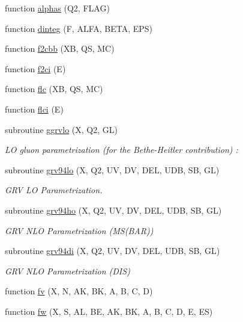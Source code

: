 \begin{DoxyCompactItemize}
function \hyperlink{djangoh__h_8f_af302ea72f46852040a91bbc6903668bb}{alphas} (Q2, F\+L\+AG)
\item 
function \hyperlink{djangoh__h_8f_a8f516ecea0c35714a195bc2245c008ec}{dinteg} (F, A\+L\+FA, B\+E\+TA, E\+PS)
\item 
function \hyperlink{djangoh__h_8f_ad21686603a997dca7276e97fdd737e95}{f2cbb} (XB, QS, MC)
\item 
function \hyperlink{djangoh__h_8f_a2ab06e9e548400420656b6514b985cb4}{f2ci} (E)
\item 
function \hyperlink{djangoh__h_8f_afc3079686b4b92832fe17ea940a7bd71}{flc} (XB, QS, MC)
\item 
function \hyperlink{djangoh__h_8f_a76aaa4502a6d8e0661a3e6921d3254e6}{flci} (E)
\item 
subroutine \hyperlink{djangoh__h_8f_a95790a4fe3b71ec2ca57ae683c2ff92e}{ggrvlo} (X, Q2, GL)
\begin{DoxyCompactList}\small\item\em LO gluon parametrization (for the Bethe-\/\+Heitler contribution) \+: \end{DoxyCompactList}\item 
subroutine \hyperlink{djangoh__h_8f_a5a7b1f97eb6b9635e61f608e336d2312}{grv94lo} (X, Q2, UV, DV, D\+EL, U\+DB, SB, GL)
\begin{DoxyCompactList}\small\item\em G\+RV LO Parametrization. \end{DoxyCompactList}\item 
subroutine \hyperlink{djangoh__h_8f_a5cf1c4c7f3996a1ee8f4332aac26168f}{grv94ho} (X, Q2, UV, DV, D\+EL, U\+DB, SB, GL)
\begin{DoxyCompactList}\small\item\em G\+RV N\+LO Parametrization (M\+S(\+B\+A\+R)) \end{DoxyCompactList}\item 
subroutine \hyperlink{djangoh__h_8f_ae9316822bf38bbb4d73b1f893bbf1e62}{grv94di} (X, Q2, UV, DV, D\+EL, U\+DB, SB, GL)
\begin{DoxyCompactList}\small\item\em G\+RV N\+LO Parametrization (D\+IS) \end{DoxyCompactList}\item 
function \hyperlink{djangoh__h_8f_a348f1db876b776eb46668701b6a206e4}{fv} (X, N, AK, BK, A, B, C, D)
\item 
function \hyperlink{djangoh__h_8f_aee6d8ef112bf3dd290de181562566c6c}{fw} (X, S, AL, BE, AK, BK, A, B, C, D, E, ES)

\end{DoxyCompactItemize}
